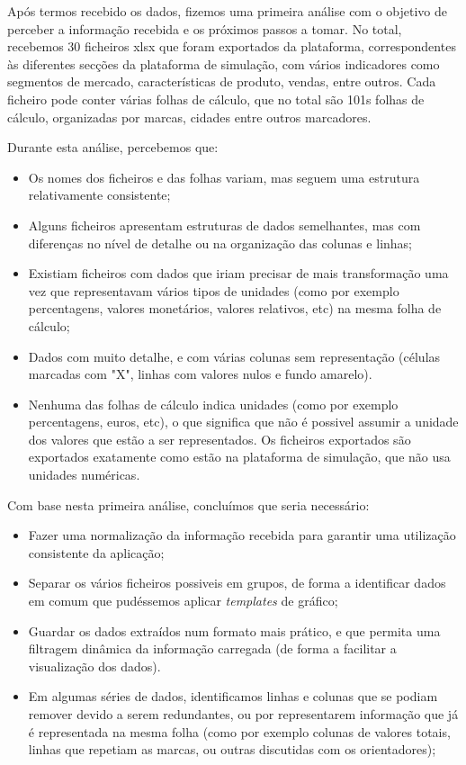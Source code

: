 Após termos recebido os dados, fizemos uma primeira análise com o objetivo de perceber a informação recebida e os próximos passos a tomar. No total, recebemos 30 ficheiros \gls{xlsx} que foram exportados da plataforma, correspondentes às diferentes secções da plataforma de simulação, com vários indicadores como segmentos de mercado, características de produto, vendas, entre outros. Cada ficheiro pode conter várias folhas de cálculo, que no total são 101s folhas de cálculo, organizadas por marcas, cidades entre outros marcadores.

Durante esta análise, percebemos que:

\begin{itemize}
    \item Os nomes dos ficheiros e das folhas variam, mas seguem uma estrutura relativamente consistente;
    \item Alguns ficheiros apresentam estruturas de dados semelhantes, mas com diferenças no nível de detalhe ou na organização das colunas e linhas;
    \item Existiam ficheiros com dados que iriam precisar de mais transformação uma vez que representavam vários tipos de unidades (como por exemplo percentagens, valores monetários, valores relativos, etc) na mesma folha de cálculo;
    \item Dados com muito detalhe, e com várias colunas sem representação (células marcadas com "X", linhas com valores nulos e fundo amarelo).
    \item Nenhuma das folhas de cálculo indica unidades (como por exemplo percentagens, euros, etc), o que significa que não é possivel assumir a unidade dos valores que estão a ser representados. Os ficheiros exportados são exportados exatamente como estão na plataforma de simulação, que não usa unidades numéricas.
\end{itemize}

Com base nesta primeira análise, concluímos que seria necessário:
\begin{itemize}
    \item Fazer uma normalização da informação recebida para garantir uma utilização consistente da aplicação;
    \item Separar os vários ficheiros possiveis em grupos, de forma a identificar dados em comum que pudéssemos aplicar \textit{templates} de gráfico;
    \item Guardar os dados extraídos num formato mais prático, e que permita uma filtragem dinâmica da informação carregada (de forma a facilitar a visualização dos dados).
    \item Em algumas séries de dados, identificamos linhas e colunas que se podiam remover devido a serem redundantes, ou por representarem informação que já é representada na mesma folha (como por exemplo colunas de valores totais, linhas que repetiam as marcas, ou outras discutidas com os orientadores);
\end{itemize}

